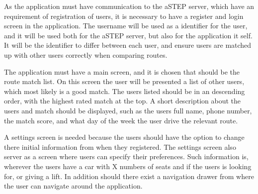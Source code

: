 As the application must have communication to the aSTEP server, which have an requirement of registration of users, it is necessary to have a register and login screen in the application. The username will be used as a identifier for the user, and it will be used both for the aSTEP server, but also for the application it self. It will be the identifier to differ between each user, and ensure users are matched up with other users correctly when comparing routes.

The application must have a main screen, and it is chosen that should be the route match list. On this screen the user will be presented a list of other users, which most likely is a good match. The users listed should be in an descending order, with the highest rated match at the top. A short description about the users and match should be displayed, such as the users full name, phone number, the match score, and what day of the week the user drive the relevant route.

A settings screen is needed because the users should have the option to change there initial information from when they registered. The settings screen also server as a screen where users can specify their preferences. Such information is, wherever the users have a car with X numbers of seats and if the users is looking for, or giving a lift.
In addition should there exist a navigation drawer from where the user can navigate around the application.

